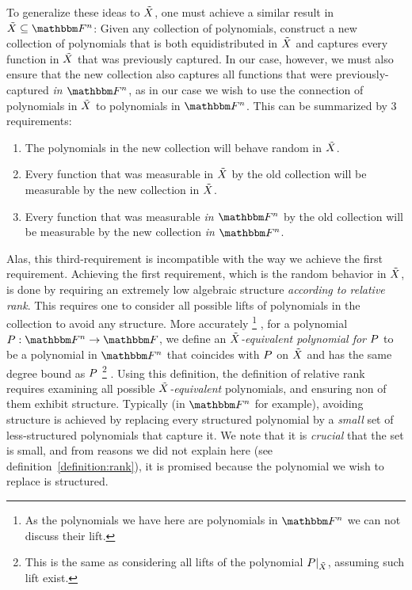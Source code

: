 To generalize these ideas to ${\tilde{X}}$, one must achieve a similar result in $\variety \subseteq \field$:
Given any collection of polynomials, construct a new collection of polynomials that is both equidistributed in ${\tilde{X}}$
and captures every function in ${\tilde{X}}$ that was previously captured.
In our case, however, we must also ensure that the new collection also captures all functions that were previously-captured \emph{in $\field$},
as in our case we wish to use the connection of polynomials in ${\tilde{X}}$ to polynomials in $\field$.
This can be summarized by 3 requirements:
\begin{enumerate}
    \item The polynomials in the new collection will behave random in ${\tilde{X}}$.
    \item Every function that was measurable in ${\tilde{X}}$ by the old collection will be measurable by the new collection in ${\tilde{X}}$.
    \item Every function that was measurable \emph{in $\field$} by the old collection will be measurable by the new collection \emph{in $\field$}.
\end{enumerate}
Alas, this third-requirement is incompatible with the way we achieve the first requirement.
Achieving the first requirement, which is the random behavior in ${\tilde{X}}$, is done by requiring an extremely low algebraic structure \emph{according to relative rank}.
This requires one to consider all possible lifts of polynomials in the collection to avoid any structure.
\newline
More accurately
\footnote{As the polynomials we have here are polynomials in $\field$ we can not discuss their lift.}
, for a polynomial $\funcdef{\genpoly}{\field}{\basefield}$,
we define an \emph{${\tilde{X}}$-equivalent polynomial for $\genpoly$} to be
a polynomial in $\field$ that coincides with $\genpoly$ on ${\tilde{X}}$ and has the same degree bound as $\genpoly$
\footnote{This is the same as considering all lifts of the polynomial $\restrictfunc{\genpoly}{\variety}$, assuming such lift exist.}
.
Using this definition, the definition of relative rank requires examining all possible \emph{${\tilde{X}}$-equivalent} polynomials,
and ensuring non of them exhibit structure.
\newline
Typically (in $\field$ for example), avoiding structure is achieved by replacing every structured polynomial by a \emph{small}
set of less-structured polynomials that capture it.
We note that it is \emph{crucial} that the set is small, and from reasons we did not explain here (see definition~\ref{definition:rank}), it is promised because the polynomial we wish to replace is structured.
